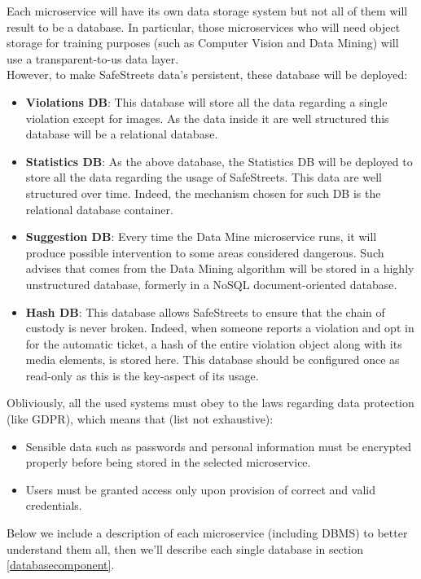 Each microservice will have its own data storage system but not all of them will result to be a database. In particular, those microservices who will need object storage for training purposes (such as Computer Vision and Data Mining) will use a transparent-to-us data layer.\\
However, to make SafeStreets data's persistent, these database will be deployed:
\begin{itemize}
	\item \textbf{Violations DB}: This database will store all the data regarding a single violation except for images. As the data inside it are well structured this database will be a relational database.
	\item \textbf{Statistics DB}: As the above database, the Statistics DB will be deployed to store all the data regarding the usage of SafeStreets. This data are well structured over time. Indeed, the mechanism chosen for such DB is the relational database container.
	\item \textbf{Suggestion DB}: Every time the Data Mine microservice runs, it will produce possible intervention to some areas considered dangerous. Such advises that comes from the Data Mining algorithm will be stored in a highly unstructured database, formerly in a NoSQL document-oriented database.
	\item \textbf{Hash DB}: This database allows SafeStreets to ensure that the chain of custody is never broken. Indeed, when someone reports a violation and opt in for the automatic ticket, a hash of the entire violation object along with its media elements, is stored here. This database should be configured once as read-only as this is the key-aspect of its usage.
\end{itemize}
Obliviously, all the used systems must obey to the laws regarding data protection (like GDPR), which means that (list not exhaustive):
\begin{itemize}
\item Sensible data such as passwords and personal information must be encrypted properly before being stored in the selected microservice.
\item Users must be granted access only upon provision of correct and valid credentials.
\end{itemize}

Below we include a description of each microservice (including DBMS) to better understand them all, then we'll describe each single database in section \ref{databasecomponent}.